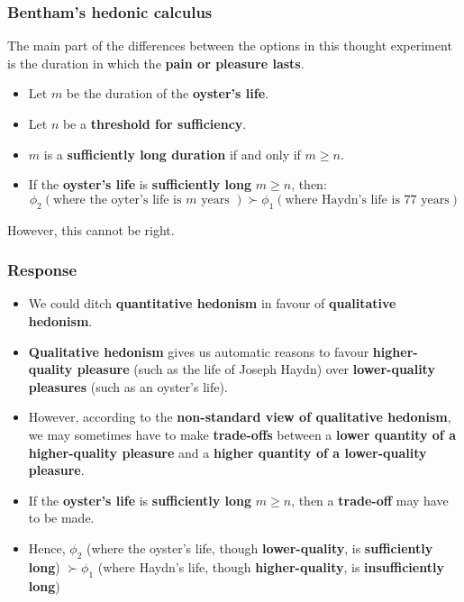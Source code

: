 \documentclass[11pt]{article}
\begin{document}
\subsubsection{Bentham's hedonic calculus}
\label{sec:org2e764dd}
The main part of the differences between the options in this thought experiment is the duration in which the \textbf{pain or pleasure lasts}.  \\

\begin{itemize}
\item Let \(m\) be the duration of the \textbf{oyster's life}.
\item Let \(n\) be a \textbf{threshold for sufficiency}.
\item \(m\) is a \textbf{sufficiently long duration} if and only if \(m \ge n\).
\item If the \textbf{oyster's life} is \textbf{sufficiently long} \(m \ge n\), then:
\[\phi_2 (\text{where the oyter's life is } m \text{ years }) \succ \phi_1 (\text{where Haydn's life is 77 years})\]
\end{itemize}

However, this cannot be right.

 \newpage
\subsubsection{Response}
\label{sec:org22bc6c7}
\begin{itemize}
\item We could ditch \textbf{quantitative hedonism} in favour of \textbf{qualitative hedonism}.
\item \textbf{Qualitative hedonism} gives us automatic reasons to favour \textbf{higher-quality pleasure} (such as the life of Joseph Haydn) over \textbf{lower-quality pleasures} (such as an oyster's life).
\item However, according to the \textbf{non-standard view of qualitative hedonism}, we may sometimes have to make \textbf{trade-offs} between a \textbf{lower quantity of a higher-quality pleasure} and a \textbf{higher quantity of a lower-quality pleasure}.
\item If the \textbf{oyster's life} is \textbf{sufficiently long} \(m \ge n\), then a \textbf{trade-off} may have to be made.
\item Hence, \(\phi_2\) (where the oyster's life, though \textbf{lower-quality}, is \textbf{sufficiently long}) \(\succ \phi_1\) (where Haydn's life, though \textbf{higher-quality}, is \textbf{insufficiently long})
\end{itemize}
\end{document}
